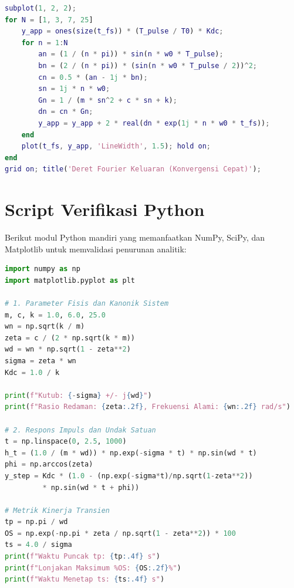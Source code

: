 \documentclass[journal]{IEEEtran}
\begin{document}
\begin{lstlisting}[language=Matlab]
subplot(1, 2, 2);
for N = [1, 3, 7, 25]
    y_app = ones(size(t_fs)) * (T_pulse / T0) * Kdc;
    for n = 1:N
        an = (1 / (n * pi)) * sin(n * w0 * T_pulse);
        bn = (2 / (n * pi)) * (sin(n * w0 * T_pulse / 2))^2;
        cn = 0.5 * (an - 1j * bn);
        sn = 1j * n * w0;
        Gn = 1 / (m * sn^2 + c * sn + k);
        dn = cn * Gn;
        y_app = y_app + 2 * real(dn * exp(1j * n * w0 * t_fs));
    end
    plot(t_fs, y_app, 'LineWidth', 1.5); hold on;
end
grid on; title('Deret Fourier Keluaran (Konvergensi Cepat)');
\end{lstlisting}

\section{Script Verifikasi Python}
Berikut modul Python mandiri yang memanfaatkan NumPy, SciPy, dan Matplotlib untuk memvalidasi penurunan analitik:
\begin{lstlisting}[language=Python]
import numpy as np
import matplotlib.pyplot as plt

# 1. Parameter Fisis dan Kanonik Sistem
m, c, k = 1.0, 6.0, 25.0
wn = np.sqrt(k / m)
zeta = c / (2 * np.sqrt(k * m))
wd = wn * np.sqrt(1 - zeta**2)
sigma = zeta * wn
Kdc = 1.0 / k

print(f"Kutub: {-sigma} +/- j{wd}")
print(f"Rasio Redaman: {zeta:.2f}, Frekuensi Alami: {wn:.2f} rad/s")

# 2. Respons Impuls dan Undak Satuan
t = np.linspace(0, 2.5, 1000)
h_t = (1.0 / (m * wd)) * np.exp(-sigma * t) * np.sin(wd * t)
phi = np.arccos(zeta)
y_step = Kdc * (1.0 - (np.exp(-sigma*t)/np.sqrt(1-zeta**2)) 
         * np.sin(wd * t + phi))

# Metrik Kinerja Transien
tp = np.pi / wd
OS = np.exp(-np.pi * zeta / np.sqrt(1 - zeta**2)) * 100
ts = 4.0 / sigma
print(f"Waktu Puncak tp: {tp:.4f} s")
print(f"Lonjakan Maksimum %OS: {OS:.2f}%")
print(f"Waktu Menetap ts: {ts:.4f} s")
\end{lstlisting}
\end{document}

